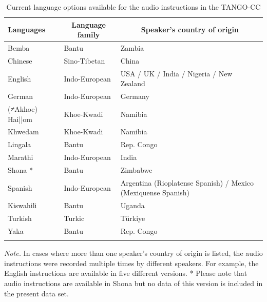 \documentclass[
  man,floatsintext]{apa7}
\begin{document}
\begin{table}[tbp]

\begin{center}
\begin{threeparttable}

\caption{\label{tab:langtab}Current language options available for the audio instructions in the TANGO-CC}

\begin{tabular}{lll}
\toprule
Languages & \multicolumn{1}{c}{Language family} & \multicolumn{1}{c}{Speaker's country of origin}\\
\midrule
Bemba & Bantu & Zambia\\
Chinese & Sino-Tibetan & China\\
English & Indo-European & USA / UK / India / Nigeria / New Zealand\\
German & Indo-European & Germany\\
(≠Akhoe) Hai||om & Khoe-Kwadi & Namibia\\
Khwedam & Khoe-Kwadi & Namibia\\
Lingala & Bantu & Rep. Congo\\
Marathi & Indo-European & India\\
Shona * & Bantu & Zimbabwe\\
Spanish & Indo-European & Argentina (Rioplatense Spanish) / Mexico (Mexiquense Spanish)\\
Kiswahili & Bantu & Uganda\\
Turkish & Turkic & Türkiye\\
Yaka & Bantu & Rep. Congo\\
\bottomrule
\addlinespace
\end{tabular}

\begin{tablenotes}[para]
\normalsize{\textit{Note.} In cases where more than one speaker's country of origin is listed, the audio instructions were recorded multiple times by different speakers. For example, the English instructions are available in five different versions. * Please note that audio instructions are available in Shona but no data of this version is included in the present data set.}
\end{tablenotes}

\end{threeparttable}
\end{center}

\end{table}
\end{document}
